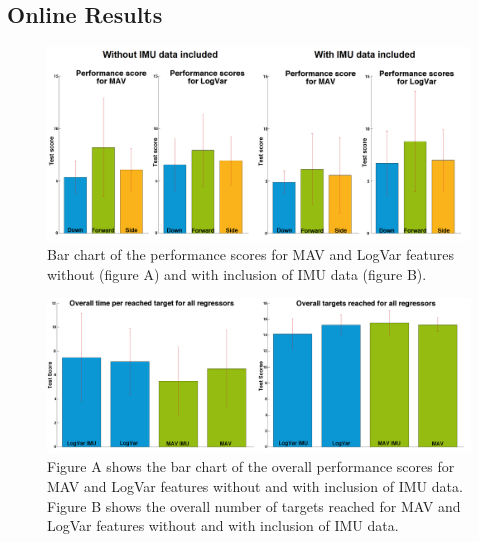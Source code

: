 \begin{multicols}{2}
	\subsection{Online Results}

\begin{figure}[H]
	\centering
	\includegraphics[width=1\textwidth]{figures/paperFigures/GotItTimeCol}  %
	\caption{Bar chart of the performance scores for MAV and LogVar features without (figure A) and with inclusion of IMU data (figure B).}
	\label{fig:GotItTimeCol}
\end{figure}
	
\begin{figure}[H]
	\centering
	\includegraphics[width=1\textwidth]{figures/paperFigures/allRegressorBarzTimeScoreForTargetTestCol}  %
	\caption{Figure A shows the bar chart of the overall performance scores for MAV and LogVar features without and with inclusion of IMU data. Figure B shows the overall number of targets reached for MAV and LogVar features without and with inclusion of IMU data.}
	\label{fig:TargetScoresTargetsCol}  %
\end{figure}
	


\end{multicols}
